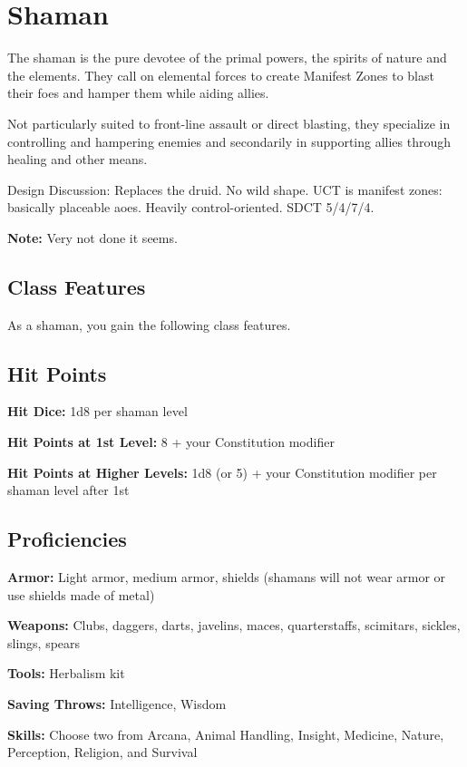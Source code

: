\section{Shaman\label{class:shaman}}

The shaman is the pure devotee of the primal powers, the spirits of nature and the elements. They call on elemental forces to create Manifest Zones to blast their foes and hamper them while aiding allies.

Not particularly suited to front-line assault or direct blasting, they specialize in controlling and hampering enemies and secondarily in supporting allies through healing and other means.

Design Discussion: Replaces the druid. No wild shape. UCT is manifest zones: basically placeable aoes. Heavily control-oriented. SDCT 5/4/7/4.

\textbf{Note:} Very not done it seems.

\subsection{Class Features}

As a shaman, you gain the following class features.

\subsection{Hit Points}

\textbf{Hit Dice:} 1d8 per shaman level

\textbf{Hit Points at 1st Level:} 8 + your Constitution modifier

\textbf{Hit Points at Higher Levels:} 1d8 (or 5) + your Constitution modifier per shaman level after 1st

\subsection{Proficiencies}

\textbf{Armor:} Light armor, medium armor, shields (shamans will not wear armor or use shields made of metal)

\textbf{Weapons:} Clubs, daggers, darts, javelins, maces, quarterstaffs, scimitars, sickles, slings, spears

\textbf{Tools:} Herbalism kit

\textbf{Saving Throws:} Intelligence, Wisdom

\textbf{Skills:} Choose two from Arcana, Animal Handling, Insight, Medicine, Nature, Perception, Religion, and Survival

